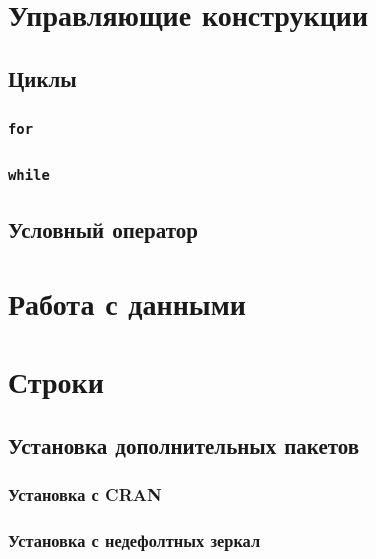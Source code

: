 \documentclass[
  letterpaper,
]{scrbook}
\theoremstyle{definition}
\theoremstyle{remark}
\begin{document}

\chapter{Управляющие конструкции}\label{controlflow}

\section{Циклы}\label{controlflow-forwhile}

\subsection{\texorpdfstring{\texttt{for}}{for}}\label{controlflow-for}

\subsection{\texorpdfstring{\texttt{while}}{while}}\label{controlflow-while}

\section{Условный оператор}\label{controlflow-if}


\chapter{Работа с данными}\label{rdata}


\chapter{Строки}\label{rstrings}

\section{Установка дополнительных пакетов}\label{rstrings-packages}

\subsection{Установка с CRAN}\label{rstrings-packages-cran}

\subsection{Установка с недефолтных
зеркал}\label{rstrings-packages-mirrors}
\end{document}
